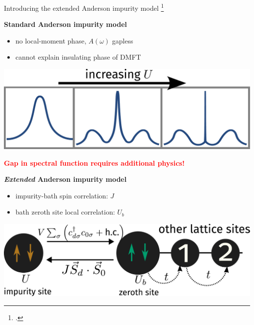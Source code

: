 \documentclass[10pt,aspectratio=169]{beamer}
\newcommand{\focus}[1]{\textcolor{red}{\bf{#1}}}
\begin{document}
\begin{frame}{Introducing the extended Anderson impurity model}
\footcite{anderson_1961,hrk_wilson_1980,hewson1993,costi_hewson_1990,costi2000,metzner_volhardt_1989,kotliar1996}
\vspace*{-20pt}

\begin{minipage}{0.5\textwidth}
	{\bf Standard Anderson impurity model\\}
\begin{itemize}
	\item no local-moment phase, \(A(\omega)\) gapless
	\item cannot explain insulating phase of DMFT
\end{itemize}
\end{minipage}
\hspace*{\fill}
\begin{minipage}{0.45\textwidth}
\includegraphics[width=\textwidth]{standard-siam.pdf}
\end{minipage}

\vspace*{30pt}

\focus{Gap in spectral function requires additional physics!}

\vspace*{30pt}

\begin{minipage}{0.5\textwidth}
\textbf{ {\it Extended} Anderson impurity model\\}
\begin{itemize}
\item impurity-bath spin correlation: \(J\)
\item bath zeroth site local correlation: \(U_b\)
\end{itemize}
\end{minipage}
\hspace*{\fill}
\begin{minipage}{0.48\textwidth}
\includegraphics[width=\textwidth]{zeromode_bare.pdf}
\end{minipage}

\end{frame}
\end{document}
